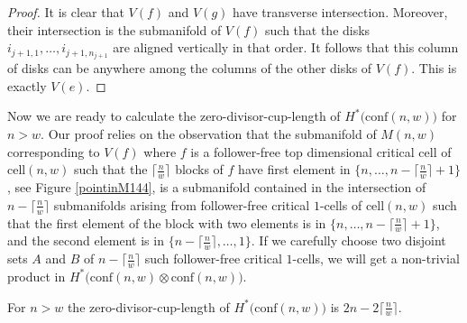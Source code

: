 \begin{proof}
It is clear that $V(f)$ and $V(g)$ have transverse intersection.
Moreover, their intersection is the submanifold of $V(f)$ such that the disks $i_{j+1, 1}, \dots, i_{j+1, n_{j+1}}$ are aligned vertically in that order.
It follows that this column of disks can be anywhere among the columns of the other disks of $V(f)$. 
This is exactly $V(e)$.
\end{proof}

Now we are ready to calculate the zero-divisor-cup-length of $H^{*}\big(\text{conf}(n,w)\big)$ for $n>w$.
Our proof relies on the observation that the submanifold of $M(n,w)$ corresponding to $V(f)$ where $f$ is a follower-free top dimensional critical cell of $\text{cell}(n,w)$ such that the $\big\lceil\frac{n}{w}\big\rceil$ blocks of $f$ have first element in $\big\{n,\dots, n-\big\lceil\frac{n}{w}\big\rceil+1\big\}$, see Figure \ref{pointinM144}, is a submanifold contained in the intersection of $n-\big\lceil\frac{n}{w}\big\rceil$ submanifolds arising from follower-free critical $1$-cells of $\text{cell}(n,w)$ such that the first element of the block with two elements is in $\big\{n,\dots, n-\big\lceil\frac{n}{w}\big\rceil+1\big\}$, and the second element is in $\big\{n-\big\lceil\frac{n}{w}\big\rceil,\dots, 1\big\}$.
If we carefully choose two disjoint sets $A$ and $B$ of $n-\big\lceil\frac{n}{w}\big\rceil$ such follower-free critical $1$-cells, we will get a non-trivial product in $H^{*}\big(\text{conf}(n,w)\otimes\text{conf}(n,w)\big)$.

\begin{lem}\label{cup divisor cup length for all w}
For $n>w$ the zero-divisor-cup-length of $H^{*}\big(\text{conf}(n,w)\big)$ is $2n-2\big\lceil\frac{n}{w}\big\rceil$.
\end{lem}


